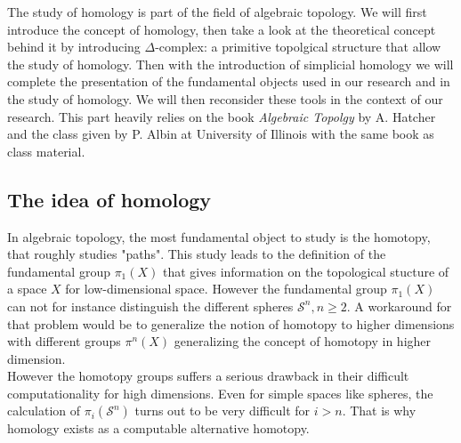 \documentclass[12pt, a4paper]{article}
\begin{document}
The study of homology is part of the field of algebraic topology. We will first introduce the concept of homology, then take a look at the theoretical concept behind it by introducing $\Delta$-complex: a primitive topolgical structure that allow the study of homology. Then with the introduction of simplicial homology we will complete the presentation of the fundamental objects used in our research and in the study of homology. We will then reconsider these tools in the context of our research. This part heavily relies on the book \textit{Algebraic Topolgy} by A. Hatcher \cite{hatcher_algebraic_2002} and the class given by P. Albin at University of Illinois \cite{albin_1_2018} with the same book as class material. 

\subsection{The idea of homology}

In algebraic topology, the most fundamental object to study is the homotopy, that roughly studies "paths". This study leads to the definition of the fundamental group $\pi_1(X)$ that gives information on the topological stucture of a space $X$ for low-dimensional space. However the fundamental group $\pi_1(X)$ can not for instance distinguish the different spheres $\mathcal{S}^n, n\ge 2$. A workaround for that problem would be to generalize the notion of homotopy to higher dimensions with different groups $\pi^n(X)$ generalizing the concept of homotopy in higher dimension. \\

However the homotopy groups suffers a serious drawback in their difficult computationality for high dimensions. Even for simple spaces like spheres, the calculation of $\pi_i(\mathcal{S}^n)$ turns out to be very difficult for $i > n$. That is why homology exists as a computable alternative homotopy.\\
\end{document}

